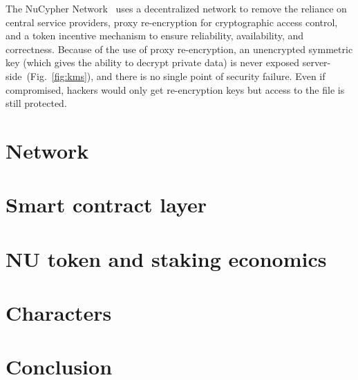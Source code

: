 \documentclass[longbibliography,nofootinbib,twocolumn]{revtex4-1}
\newcommand{\network}{The NuCypher Network}
\newcommand{\figref}[1]{Fig.~\ref{#1}}
\begin{document}
\network~ uses a decentralized network to remove the reliance on central service providers, proxy re-encryption for cryptographic
access control, and a token incentive mechanism to ensure reliability, availability, and correctness.
Because of the use of proxy re-encryption, an unencrypted symmetric key (which gives the ability to decrypt private data) is never exposed
server-side~(\figref{fig:kms}), and there is no single point of security failure.
Even if compromised, hackers would only get re-encryption keys but access to the file is still protected.

\section{Network}

\section{Smart contract layer}

\section{NU token and staking economics}

\section{Characters}

\section{Conclusion}


\end{document}
